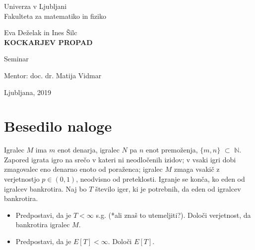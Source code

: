 \documentclass[12pt, a4paper]{article}
\begin{document}
\begin{titlepage}
\begin{center}

\large
Univerza v Ljubljani\\
\normalsize
Fakulteta za matematiko in fiziko\\

\vspace{3 cm} 

\large
Eva Deželak in Ines Šilc\\

\vspace{0.5cm}
\LARGE
\textbf{KOCKARJEV PROPAD}

\vspace{0.5 cm}
\normalsize
Seminar

\vspace{1.5cm}
\normalsize
Mentor: doc. dr. Matija Vidmar

\vspace{3cm}


\vfill

\large Ljubljana, 2019

\end{center}
\end{titlepage}

\newpage

\tableofcontents
\vspace{20mm}

 \section[Besedilo naloge]{Besedilo naloge}



Igralec $M$ ima $m$ enot denarja, igralec $N$ pa $n$ enot premoženja, $\{m, n\}$ $\subset$ $\mathbb{N}$. Zapored igrata igro na srečo v kateri ni neodločenih izidov; v vsaki igri dobi zmagovalec eno denarno enoto od poraženca; igralec $M$ zmaga vsakič z verjetnostjo $p \in (0, 1)$, neodvisno od preteklosti. Igranje se konča, ko eden od igralcev bankrotira. Naj bo $T$ število iger, ki je potrebnih, da eden od igralcev bankrotira.

\begin{itemize}
    \item Predpostavi, da je $T < \infty$ s.g. (*ali znaš to utemeljiti?). Določi verjetnost, da bankrotira igralec $M$.
    \item Predpostavi, da je $E[T] < \infty$. Določi $E[T]$.
\end{itemize}
\end{document}
